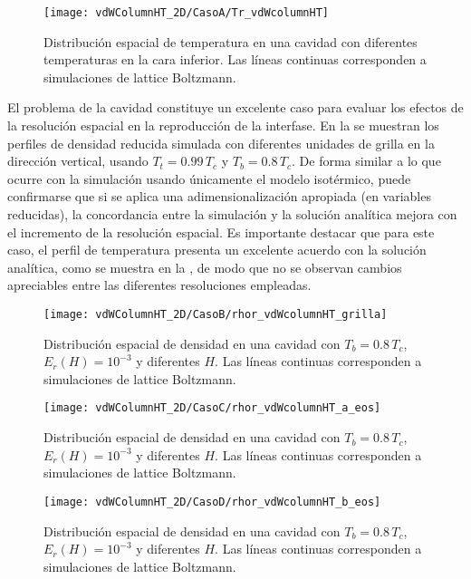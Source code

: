 \begin{figure}[ht]
	\centering
	\texttt{[image: vdWColumnHT\_2D/CasoA/Tr\_vdWcolumnHT]}
	\caption{Distribuci\'on espacial de temperatura en una cavidad con diferentes temperaturas en la cara inferior. Las l\'ineas continuas corresponden a simulaciones de lattice Boltzmann.}
	\label{fig:vdWColumnHT_Tr}
\end{figure}

El problema de la cavidad constituye un excelente caso para evaluar los efectos de la resoluci\'on espacial en la reproducci\'on de la interfase. En la  se muestran los perfiles de densidad reducida simulada con diferentes unidades de grilla en la direcci\'on vertical, usando $T_t = 0.99 \, T_c$ y $T_b = 0.8 \, T_c$. De forma similar a lo que ocurre con la simulaci\'on usando \'unicamente el modelo isot\'ermico, puede confirmarse que si se aplica una adimensionalizaci\'on apropiada (en variables reducidas), la concordancia entre la simulaci\'on y la soluci\'on anal\'itica mejora con el incremento de la resoluci\'on espacial. Es importante destacar que para este caso, el perfil de temperatura presenta un excelente acuerdo con la soluci\'on anal\'itica, como se muestra en la , de modo que no se observan cambios apreciables entre las diferentes resoluciones empleadas.

\begin{figure}[ht]
	\centering
	\texttt{[image: vdWColumnHT\_2D/CasoB/rhor\_vdWcolumnHT\_grilla]}
	\caption{Distribuci\'on espacial de densidad en una cavidad con $T_b = 0.8 \, T_c$, $E_r(H)=10^{-3}$ y diferentes $H$. Las l\'ineas continuas corresponden a simulaciones de lattice Boltzmann.}
	\label{fig:vdWColumnHT_rhor_grilla}
\end{figure}



\begin{figure}[ht]
	\centering
	\texttt{[image: vdWColumnHT\_2D/CasoC/rhor\_vdWcolumnHT\_a\_eos]}
	\caption{Distribuci\'on espacial de densidad en una cavidad con $T_b = 0.8 \, T_c$, $E_r(H)=10^{-3}$ y diferentes $H$. Las l\'ineas continuas corresponden a simulaciones de lattice Boltzmann.}
	\label{fig:vdWColumnHT_rhor_grilla}
\end{figure}

\begin{figure}[ht]
	\centering
	\texttt{[image: vdWColumnHT\_2D/CasoD/rhor\_vdWcolumnHT\_b\_eos]}
	\caption{Distribuci\'on espacial de densidad en una cavidad con $T_b = 0.8 \, T_c$, $E_r(H)=10^{-3}$ y diferentes $H$. Las l\'ineas continuas corresponden a simulaciones de lattice Boltzmann.}
	\label{fig:vdWColumnHT_rhor_grilla}
\end{figure}